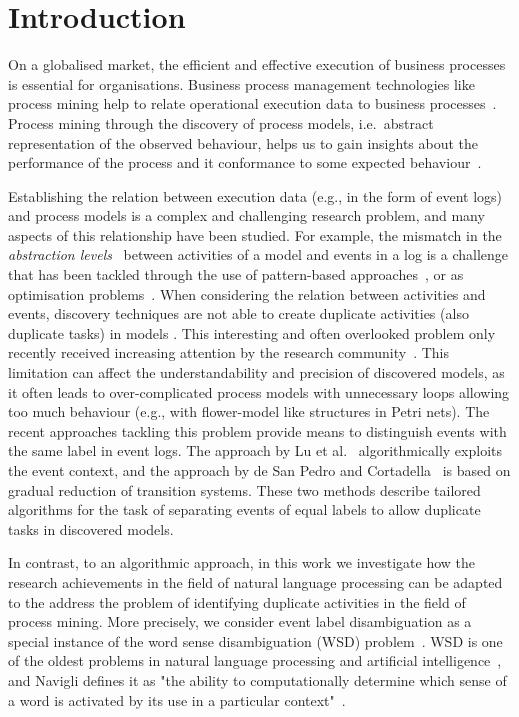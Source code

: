\section{Introduction}
\label{sec:intro}
On a globalised market, the efficient and effective execution of business processes is essential for organisations. Business process management technologies like process mining help to relate operational execution data to business processes~\cite{DBLP:books/daglib/0031128}. Process mining through the discovery of process models, i.e.\ abstract representation of the observed behaviour, helps us to gain insights about the performance of the process and it conformance to some expected behaviour~\cite{DBLP:books/sp/Aalst16}.

Establishing the relation between execution data (e.g., in the form of event logs) and process models is a complex and challenging research problem, and many aspects of this relationship have been studied. For example, the mismatch in the \emph{abstraction levels}~\cite{DBLP:journals/is/0001MW14} between activities of a model and events in a log is a challenge that has been tackled through the use of pattern-based approaches~\cite{DBLP:conf/bpm/MannhardtLRAT16}, or as optimisation problems~\cite{DBLP:conf/caise/SenderovichRGMM16}.%
When considering the relation between activities and events, discovery techniques are not able to create duplicate activities (also duplicate tasks) in models \cite{DBLP:journals/topnoc/Carmona12,tie2009clustering,XiaoHui2009alphaStartStar}. This interesting and often overlooked problem only recently received increasing attention by the research community~\cite{DBLP:conf/bpm/LuFBA16,DBLP:conf/bpm/PedroC16}. This limitation can affect the understandability and precision of discovered models, as it often leads to over-complicated process models with unnecessary loops allowing too much behaviour (e.g., with flower-model like structures in Petri nets).
The recent approaches tackling this problem provide means to distinguish events with the same label in event logs. The approach by Lu et al.~\cite{DBLP:conf/bpm/LuFBA16} algorithmically exploits the event context, and the approach by de San Pedro and Cortadella~\cite{DBLP:conf/bpm/PedroC16} is based on gradual reduction of transition systems. These two methods describe tailored algorithms for the task of separating events of equal labels to allow duplicate tasks in discovered models.

In contrast, to an algorithmic approach, in this work we investigate how the research achievements in the field of natural language processing can be adapted to the address the problem of identifying duplicate activities in the field of process mining.
More precisely, we consider event label disambiguation as a special instance of the word sense disambiguation (WSD) problem~\cite{DBLP:journals/csur/Navigli09}. WSD is one of the oldest problems in natural language processing and artificial intelligence~\cite{article_from_50s}, and Navigli defines it as "the ability to computationally determine which sense of a word is activated by its use in a particular context"~\cite{DBLP:journals/csur/Navigli09}. 


